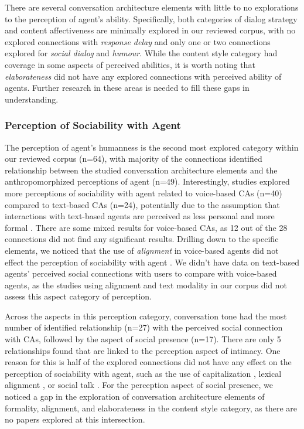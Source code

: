 There are several conversation architecture elements with little to no explorations to the perception of agent's ability. Specifically, both categories of dialog strategy and content affectiveness are minimally explored in our reviewed corpus, with no explored connections with \textit{response delay} and only one or two connections explored for \textit{social dialog} and \textit{humour}. While the content style category had coverage in some aspects of perceived abilities, it is worth noting that \textit{elaborateness} did not have any explored connections with perceived ability of agents. Further research in these areas is needed to fill these gaps in understanding.


\subsubsection{Perception of Sociability with Agent}

The perception of agent's humanness is the second most explored category within our reviewed corpus (n=64), with majority of the connections identified relationship between the studied conversation architecture elements and the anthropomorphized perceptions of agent (n=49). Interestingly, studies explored more perceptions of sociability with agent related to voice-based CAs (n=40) compared to text-based CAs (n=24), potentially due to the assumption that interactions with text-based agents are perceived as less personal and more formal \cite{kocielnik2018designing}. There are some mixed results for voice-based CAs, as 12 out of the 28 connections did not find any significant results. Drilling down to the specific elements, we noticed that the use of \textit{alignment} in voice-based agents did not effect the perception of sociability with agent \cite{healey2013relating, linnemann2018can}\cmt{[39][15]}. We didn't have data on text-based agents' perceived social connections with users to compare with voice-based agents, as the studies using alignment and text modality in our corpus did not assess this aspect category of perception.

Across the aspects in this perception category, conversation tone had the most number of identified relationship (n=27) with the perceived social connection with CAs, followed by the aspect of social presence (n=17). There are only 5 relationships found that are linked to the perception aspect of intimacy. One reason for this is half of the explored connections did not have any effect on the perception of sociability with agent, such as the use of capitalization \cite{westerman2019believe}\cmt{[9]}, lexical alignment \cite{linnemann2018can}\cmt{[15]}, or social talk \cite{lubold2016effects}\cmt{[86]}. For the perception aspect of social presence, we noticed a gap in the exploration of conversation architecture elements of formality, alignment, and elaborateness in the content style category, as there are no papers explored at this intersection.

